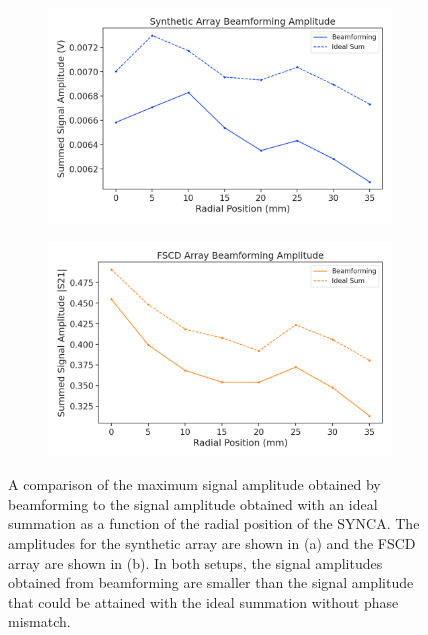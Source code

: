 \begin{figure}[htbp]
    \centering
    \begin{subfigure}[b]{0.48\textwidth}
        \includegraphics[width=1\textwidth]{figs/Chapter-5/230509_synth_beamform_amplitude.png}
        \caption{}
        \label{fig:synth-jugaad-bf-amp}
    \end{subfigure}
    \hfill
    \begin{subfigure}[b]{0.48\textwidth}
        \includegraphics[width=1\textwidth]{figs/Chapter-5/230509_fscd_array_beamform_amplitude.png}
        \caption{}
        \label{fig:jugaad-bf-amp}
    \end{subfigure}
    \hfill
    \caption{A comparison of the maximum signal amplitude obtained by beamforming to the signal amplitude obtained with an ideal summation as a function of the radial position of the SYNCA. The amplitudes for the synthetic array are shown in (a) and the FSCD array are shown in (b). In both setups, the signal amplitudes obtained from beamforming are smaller than the signal amplitude that could be attained with the ideal summation without phase mismatch.}
    \label{fig:measured-bf-amp}
\end{figure}

